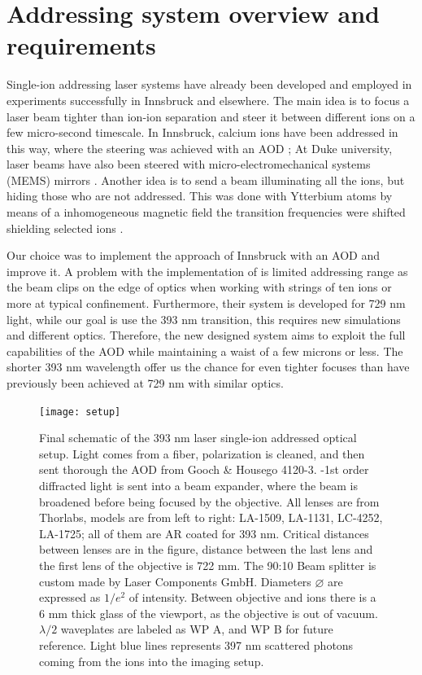 \section{Addressing system overview and requirements}
\label{sec:addressing}
Single-ion addressing laser systems have already been developed and employed in experiments successfully in Innsbruck and elsewhere. The main idea is to focus a laser beam tighter than ion-ion separation and steer it between different ions on a few micro-second timescale. In Innsbruck, calcium ions have been addressed in this way, where the steering was achieved with an AOD \cite{addressing}; At Duke university, laser beams have also been steered with micro-electromechanical systems (MEMS) mirrors \cite{addressing3}. Another idea is to send a beam illuminating all the ions, but hiding those who are not addressed. This was done with Ytterbium atoms by means of a inhomogeneous magnetic field the transition frequencies were shifted shielding selected ions \cite{addressing2}. \par
Our choice was to implement the approach of Innsbruck with an AOD and improve it. A problem with the implementation of \cite{addressing} is limited addressing range as the beam clips on the edge of optics when working with strings of ten ions or more at typical confinement. Furthermore, their system is developed for 729 nm light, while our goal is use the 393 nm transition, this requires new simulations and different optics. Therefore, the new designed system aims to exploit the full capabilities of the AOD while maintaining a waist of a few microns or less. The shorter 393 nm wavelength offer us the chance for even tighter focuses than have previously been achieved at 729 nm with similar optics.
\begin{figure}
\centering
\texttt{[image: setup]}
\caption{Final schematic of the 393 nm laser single-ion addressed optical setup. Light comes from a fiber, polarization is cleaned, and then sent thorough the AOD from Gooch \& Housego 4120-3. -1st order diffracted light is sent into a beam expander, where the beam is broadened before being focused by the objective. All lenses are from Thorlabs, models are from left to right: LA-1509, LA-1131, LC-4252, LA-1725; all of them are AR coated for 393 nm. Critical distances between lenses are in the figure, distance between the last lens and the first lens of the objective is 722 mm. The 90:10 Beam splitter is custom made by Laser Components GmbH. Diameters $\varnothing$ are expressed as $1/e^2$ of intensity. Between objective and ions there is a 6 mm thick glass of the viewport, as the objective is out of vacuum. $\lambda/2$ waveplates are labeled as WP A, and WP B for future reference. Light blue lines represents 397 nm scattered photons coming from the ions into the imaging setup.}
\label{addressingsetup}
\end{figure}
